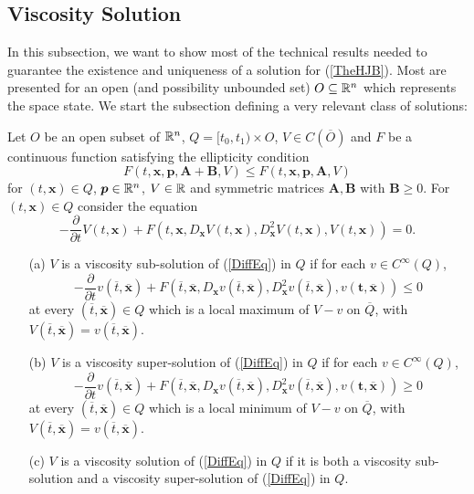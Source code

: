 \subsection{Viscosity Solution}

In this subsection, we want to show most of the technical results needed to guarantee the existence and uniqueness of a solution for (\ref{TheHJB}). Most are presented for an open (and possibility unbounded set) $O\subseteq\mathbb{R}^n$ which represents the space state. We start the subsection defining a very relevant class of solutions:

\begin{definition}
Let $O$ be an open subset of $\mathbb{R}^n$, $Q=[t_0,t_1)\times O$, $V\in C(\overline{O})$ and $F$ be a continuous function satisfying the ellipticity condition
\begin{equation}
F(t,\bm{x},\bm{p},\bm{A}+\bm{B},V)\leq F(t,\bm{x},\bm{p},\bm{A},V)
\label{EllCon}
\end{equation}
for $(t,\bm{x})\in Q$, $\bm{p}\in\mathbb{R}^n$, $V\in\mathbb{R}$ and symmetric matrices $\bm{A},\bm{B}$ with $\bm{B}\geq0$.
For $(t,\bm{x})\in Q$ consider the equation
\begin{equation}
-\frac{\partial}{\partial t}V(t,\bm{x})+F\left(t,\bm{x},D_{\bm{x}}V(t,\bm{x}),D^2_{\bm{x}}V(t,\bm{x}),V(t,\bm{x})\right)=0.
\label{DiffEq}
\end{equation}
\begin{enumerate}
\item[(a)] $V$ is a viscosity sub-solution of (\ref{DiffEq}) in $Q$ if for each $v\in C^{\infty}(Q)$,
\begin{equation}
-\frac{\partial}{\partial t}v(\overline{t},\overline{\bm{x}})+F(\overline{t},\overline{\bm{x}},D_{\bm{x}}v(\overline{t},\overline{\bm{x}}),D^2_{\bm{x}}v(\overline{t},\overline{\bm{x}}),v(\bm{t},\bm{\overline{x}}))\leq0
\end{equation}
at every $(\overline{t},\overline{\bm{x}})\in Q$ which is a local maximum of $V-v$ on $\overline{Q}$, with $V(\overline{t},\overline{\bm{x}})=v(\overline{t},\overline{\bm{x}})$.
\item[(b)] $V$ is a viscosity super-solution of (\ref{DiffEq}) in $Q$ if for each $v\in C^{\infty}(Q)$,
\begin{equation}
-\frac{\partial}{\partial t}v(\overline{t},\overline{\bm{x}})+F(\overline{t},\overline{\bm{x}},D_{\bm{x}}v(\overline{t},\overline{\bm{x}}),D^2_{\bm{x}}v(\overline{t},\overline{\bm{x}}),v(\bm{t},\bm{\overline{x}}))\geq0
\end{equation}
at every $(\overline{t},\overline{\bm{x}})\in Q$ which is a local minimum of $V-v$ on $\overline{Q}$, with $V(\overline{t},\overline{\bm{x}})=v(\overline{t},\overline{\bm{x}})$.
\item[(c)] $V$ is a viscosity solution of (\ref{DiffEq}) in $Q$ if it is both a viscosity sub-solution and a viscosity super-solution of (\ref{DiffEq}) in $Q$.
\end{enumerate}
\end{definition}

